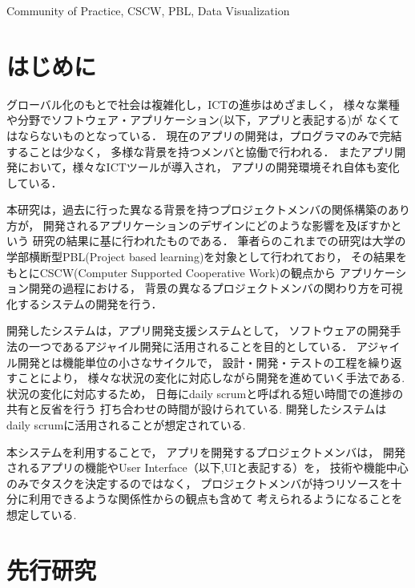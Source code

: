 \documentclass[submit,techrep]{ipsj}
\begin{document}
\begin{ekeyword}
Community of Practice, CSCW, PBL, Data Visualization
\end{ekeyword}

\maketitle

\section{はじめに}

グローバル化のもとで社会は複雑化し，ICTの進歩はめざましく，
様々な業種や分野でソフトウェア・アプリケーション(以下，アプリと表記する)が
なくてはならないものとなっている．
現在のアプリの開発は，プログラマのみで完結することは少なく，
多様な背景を持つメンバと協働で行われる．
またアプリ開発において，様々なICTツールが導入され，
アプリの開発環境それ自体も変化している．


本研究は，過去に行った異なる背景を持つプロジェクトメンバの関係構築のあり方が，
開発されるアプリケーションのデザインにどのような影響を及ぼすかという
研究\cite{book1}の結果に基に行われたものである．
筆者らのこれまでの研究は大学の学部横断型PBL(Project based learning)を対象として行われており，
その結果をもとにCSCW(Computer Supported Cooperative Work)の観点から
アプリケーション開発の過程における，
背景の異なるプロジェクトメンバの関わり方を可視化するシステムの開発を行う．


開発したシステムは，アプリ開発支援システムとして，
ソフトウェアの開発手法の一つであるアジャイル開発に活用されることを目的としている．
アジャイル開発とは機能単位の小さなサイクルで，
設計・開発・テストの工程を繰り返すことにより，
様々な状況の変化に対応しながら開発を進めていく手法である.
状況の変化に対応するため，
日毎にdaily scrumと呼ばれる短い時間での進捗の共有と反省を行う
打ち合わせの時間が設けられている.
開発したシステムはdaily scrumに活用されることが想定されている.

本システムを利用することで，
アプリを開発するプロジェクトメンバは，
開発されるアプリの機能やUser Interface（以下,UIと表記する）を，
技術や機能中心のみでタスクを決定するのではなく，
プロジェクトメンバが持つリソースを十分に利用できるような関係性からの観点も含めて
考えられるようになることを想定している.

\section{先行研究}
\label{previous-research}
\end{document}
